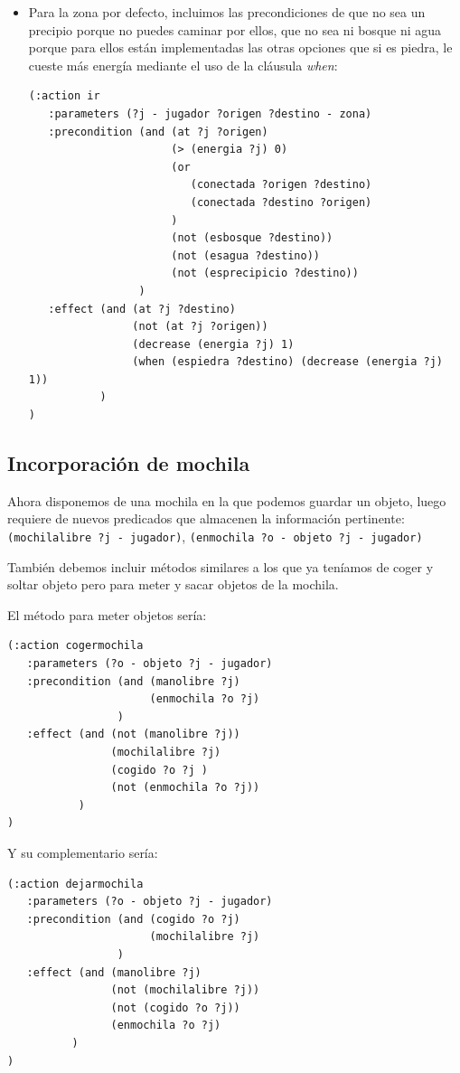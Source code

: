 \documentclass[a4paper, 11pt]{article}
\begin{document}
\begin{itemize}
			\item Para la zona por defecto, incluimos las precondiciones de que no sea un precipio porque no puedes
			caminar por ellos, que no sea ni bosque ni agua porque para ellos están implementadas las otras opciones
			que si es piedra, le cueste más energía mediante el uso de la cláusula \textit{when}:
			\begin{verbatim}
(:action ir
   :parameters (?j - jugador ?origen ?destino - zona)
   :precondition (and (at ?j ?origen)
                      (> (energia ?j) 0)
                      (or
                         (conectada ?origen ?destino)
                         (conectada ?destino ?origen)
                      )
                      (not (esbosque ?destino))
                      (not (esagua ?destino))
                      (not (esprecipicio ?destino))
                 )
   :effect (and (at ?j ?destino)
                (not (at ?j ?origen))
                (decrease (energia ?j) 1)
                (when (espiedra ?destino) (decrease (energia ?j) 1))
           )
)
			\end{verbatim}
		\end{itemize}

	\subsection{Incorporación de mochila}
		Ahora disponemos de una mochila en la que podemos guardar un objeto, luego requiere de nuevos
		predicados que almacenen la información pertinente: \verb|(mochilalibre ?j - jugador)|,
		\verb|(enmochila ?o - objeto ?j - jugador)|
		
		También debemos incluir métodos similares a los que ya teníamos de coger y soltar objeto pero
		para meter y sacar objetos de la mochila.
		
		El método para meter objetos sería:
		\begin{verbatim}
(:action cogermochila
   :parameters (?o - objeto ?j - jugador)
   :precondition (and (manolibre ?j)
                      (enmochila ?o ?j)
                 )
   :effect (and (not (manolibre ?j))
                (mochilalibre ?j)
                (cogido ?o ?j )
                (not (enmochila ?o ?j))
           )
)
		\end{verbatim}
		
		Y su complementario sería:
		\begin{verbatim}
(:action dejarmochila
   :parameters (?o - objeto ?j - jugador)
   :precondition (and (cogido ?o ?j)
                      (mochilalibre ?j)
                 )
   :effect (and (manolibre ?j)
                (not (mochilalibre ?j))
                (not (cogido ?o ?j))
                (enmochila ?o ?j)
          )
)
		\end{verbatim}
		
\end{document}
